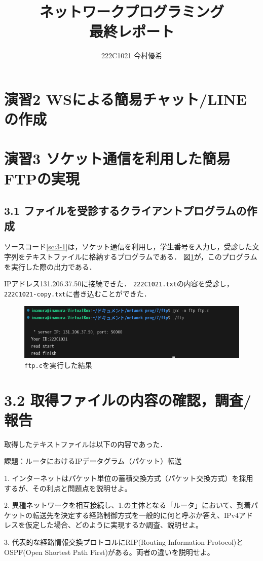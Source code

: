 \documentclass[documentclass]{jsarticle}
\begin{document}
\title{ネットワークプログラミング\\ 最終レポート}
\author{222C1021 今村優希}
\maketitle

\newpage

\section*{演習2 WSによる簡易チャット/LINEの作成}

\newpage

\section*{演習3 ソケット通信を利用した簡易FTPの実現}
\subsection*{3.1 ファイルを受診するクライアントプログラムの作成}
ソースコード\ref*{sc:3-1}は，ソケット通信を利用し，学生番号を入力し，受診した文字列をテキストファイルに格納するプログラムである．
図\ref*{fig:3-1}が，このプログラムを実行した際の出力である．

IPアドレス131.206.37.50に接続できた．
\texttt{222C1021.txt}の内容を受診し，\texttt{222C1021-copy.txt}に書き込むことができた．


\begin{figure}[H]
  \begin{center}
    \includegraphics*[]{figure/3-1.png}
  \end{center}
  \caption[]{\texttt{ftp.c}を実行した結果}
  \label{fig:3-1}
\end{figure}

\section*{3.2 取得ファイルの内容の確認，調査/報告}
取得したテキストファイルは以下の内容であった．
\begin{tcolorbox}
  課題：ルータにおけるIPデータグラム（パケット）転送

  1. インターネットはパケット単位の蓄積交換方式（パケット交換方式）を採用するが、その利点と問題点を説明せよ。
  
  2. 異種ネットワークを相互接続し、1.の主体となる「ルータ」において、到着パケットの転送先を決定する経路制御方式を一般的に何と呼ぶか答え、IPv4アドレスを仮定した場合、どのように実現するか調査、説明せよ。
  
  3. 代表的な経路情報交換プロトコルにRIP(Routing Information Protocol)とOSPF(Open Shortest Path First)がある。両者の違いを説明せよ。
\end{tcolorbox}
\end{document}
